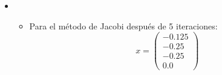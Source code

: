 \begin{itemize}
     \item 
    
    \begin{itemize}
        \item Para el método de Jacobi después de 5 iteraciones:
        \begin{equation*}
            x = 
            \begin{pmatrix}
                -0.125\\
                -0.25\\
                -0.25\\
                0.0
            \end{pmatrix}
        \end{equation*}
    
    \end{itemize} 
    
\end{itemize}